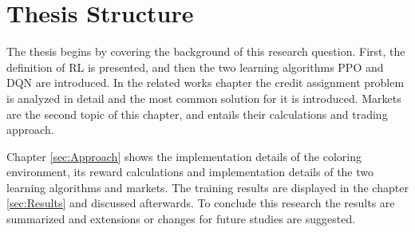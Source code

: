 \section{Thesis Structure}
The thesis begins by covering the background of this research question. First, the definition of RL is presented, and then the two learning algorithms PPO and DQN are introduced. In the related works chapter the credit assignment problem is analyzed in detail and the most common solution for it is introduced. Markets are the second topic of this chapter, and entails their calculations and trading approach. 

Chapter \ref{sec:Approach} shows the implementation details of the coloring environment, its reward calculations and implementation details of the two learning algorithms and markets. The training results are displayed in the chapter \ref{sec:Results} and discussed afterwards. To conclude this research the results are summarized and extensions or changes for future studies are suggested.